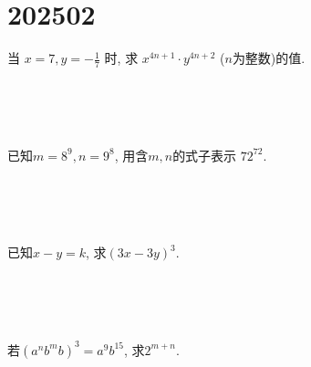 \section{202502}

\item{
    当 $ x=7, y=-\frac{1}{7}$ 时, 求 $x^{4n+1}\cdot y^{4n+2}$ ($n$为整数)的值.
    \iffalse
    \fangsong\zihao{4}
    思路: 观察到$xy=-1$,让将$x$和$y$凑成一对,相乘.直接将$x, y$的值代入表达式中进行计算.
    
    解答: 
    \begin{align*}
        \mbox{原式} &= 7^{4n+1}\cdot \left(-\frac{1}{7}\right) ^{4n+2}\\
        &= [7\times(-\frac{1}{7})]^{4n+1} \cdot(-\frac{1}{7})\\
        &= (-1)^{4n+1} \cdot(-\frac{1}{7})\\
        &= \frac{1}{7}.
    \end{align*}
    \fi
} 
\\ \\ \\
\item{
    已知$ m=8^9, n=9^8 $, 用含$m, n$的式子表示 $72^{72}$.
    \iffalse
    \fangsong\zihao{4}
    思路: 观察到$72=8\times 9$,将原式中的72分解,凑出$m, n$.
    
    解答: 
    \begin{align*}
        \mbox{原式} &= (8\times 9)^{72}\\
        &= 8^{72}\times 9^{72}\\
        &= (8^9)^8\times (9^8)^9\\
        &= m^8 n^9.
    \end{align*}
    \fi
} 
\\ \\ \\
\item{
    已知$x-y=k$, 求$(3x-3y)^3.$
    \iffalse
    \fangsong\zihao{4}
    解答: 
    \begin{align*}
        \mbox{原式} &= [3(x-y)]^3\\
        &= 27(x-y)^3\\
        &= 27k^3.
    \end{align*}
    \fi
} 
\\ \\ \\
\item{
    若$(a^nb^mb)^3 = a^9 b^{15}$, 求$2^{m+n}$.
    \iffalse
    \fangsong\zihao{4}
    思路: 先将左边化简,再与右边比较,解出$m,n$.
    
    解答: 
    \begin{align*}
        (a^nb^{m+1})^3 &= a^9b^{15}\\
        a^{3n}b^{3m+3} &= a^9b^{15}
    \end{align*}
    $\therefore 3n=9, 3m+3=15$\\
    $\therefore n=3, m=4$
    \begin{align*}
        2^{m+n} &= 2^7\\
        &= 128.
    \end{align*}
    \fi
}
